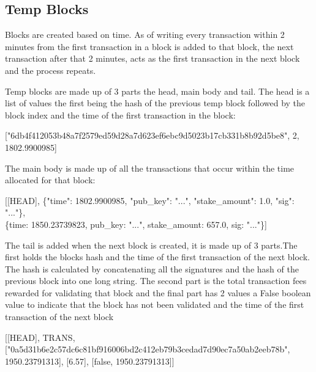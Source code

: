 \documentclass[11pt]{extarticle}
\begin{document}
\subsection{Temp Blocks}
Blocks are created based on time. As of writing every transaction within 2 minutes from the first transaction in a block is added to that block, the next transaction after that 2 minutes, acts as the first transaction in the next block and the process repeats. 

Temp blocks are made up of 3 parts the head, main body and tail. The head is a list of values the first being the hash of the previous temp block followed by the block index and the time of the first transaction in the block:

\begin{center}
["6db4f412053b48a7f2579ed59d28a7d623ef6ebc9d5023b17cb331b8b92d5be8", 2, 1802.9900985]
\end{center}

The main body is made up of all the transactions that occur within the time allocated for that block:

\begin{center}
[[HEAD], \{"time": 1802.9900985, "pub\_key": "...", "stake\_amount": 1.0, "sig": "..."\},\\          \hspace{0.75cm}\{time: 1850.23739823,  pub\_key: "...",  stake\_amount: 657.0,  sig: "..."\}]
\end{center}

The tail is added when the next block is created, it is made up of 3 parts.The first holds the blocks hash and the time of the first transaction of the next block. The hash is calculated by concatenating all the signatures and the hash of the previous block into one long string. The second part is the total transaction fees rewarded for validating that block and the final part has 2 values a False boolean value to indicate that the block has not been validated and the time of the first transaction of the next block
 
\begin{center}
[[HEAD], TRANS, \\\hspace{0cm}["0a5d31b6e2c57dc6c81bf916006bd2c412eb79b3cedad7d90ec7a50ab2eeb78b", 1950.23791313], [6.57], [false, 1950.23791313]]
\end{center}
\end{document}
